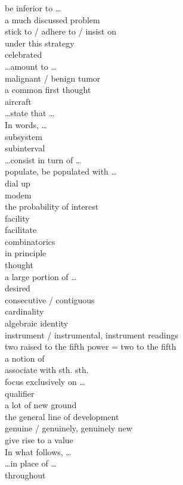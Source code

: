\documentclass[12pt]{article}
\begin{document}
be inferior to \dots \\
a much discussed problem \\
stick to / adhere to / insist on \\
under this strategy \\
celebrated \\
\dots amount to \dots \\
malignant / benign tumor \\
a common first thought \\
aircraft \\
\dots state that \dots \\
In words, \dots \\
subsystem \\
subinterval \\
\dots consist in turn of \dots \\
populate, be populated with \dots \\
dial up \\
modem \\
the probability of interest \\
facility \\
facilitate \\
combinatorics \\
in principle \\
thought \\
a large portion of \dots \\
desired \\
consecutive / contiguous \\
cardinality \\
algebraic identity \\
instrument / instrumental, instrument readings \\
two raised to the fifth power = two to the fifth \\
a notion of \\
associate with sth. sth. \\
focus exclusively on \dots \\
qualifier \\
a lot of new ground \\
the general line of development \\
genuine / genuinely, genuinely new \\
give rise to a value \\
In what follows, \dots \\
\dots in place of \dots \\
throughout \\
\end{document}
